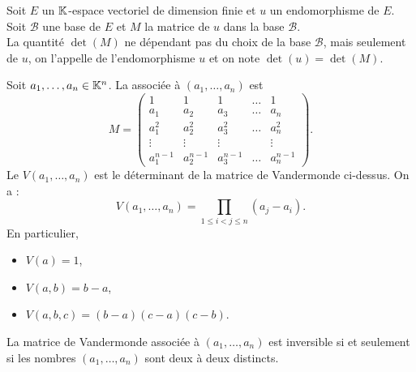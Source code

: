 \documentclass{book}
\begin{document}
\begin{Definition}
Soit $E$ un $\mathbb{K} $-espace vectoriel de dimension finie et $u$ un endomorphisme de $E$.\\
Soit $\mathcal{B}$ une base de $E$ et $M$ la matrice de $u$ dans la base $\mathcal{B}$.\\
La quantité $\det(M)$ ne dépendant pas du choix de la base $\mathcal{B}$, mais seulement de $u$, on l'appelle  de l'endomorphisme $u$ et on note $\det(u) = \det(M)$.
\end{Definition}
\begin{Exemple}

Soit $a_1,\dots,a_n \in  \mathbb{K} ^n$.
La  associée à $(a_1,\dots,a_n)$ est
\[ M = \begin{pmatrix}
    1 &  1 &  1 &  \dots &  1  \\
    a_1 &  a_2 &  a_3 &  \dots &  a_n  \\
    a_1^2 &  a_2^2 &  a_3^2 &  \dots &  a_n^2  \\
    \vdots &  \vdots &  \vdots &   &  \vdots  \\
a_1^{n-1} &  a_2^{n-1} &  a_3^{n-1} &  \dots &  a_n^{n-1}  \end{pmatrix}. \]
Le  $V(a_1,\dots,a_n)$ est le déterminant de la matrice de Vandermonde ci-dessus. On a :
$$V(a_1,\dots,a_n) = \prod_{1\leq i < j\leq n} (a_j - a_i). $$
En particulier,
\begin{itemize}
\item $V(a) = 1$,
\item $V(a,b) = b-a$,
\item $V(a,b,c) = (b-a)(c-a)(c-b)$.
\end{itemize}
La matrice de Vandermonde associée à $(a_1,\dots,a_n)$ est inversible si et seulement si les nombres $(a_1,\dots,a_n)$ sont deux à deux distincts.
\end{Exemple}
\end{document}
